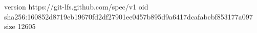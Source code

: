 version https://git-lfs.github.com/spec/v1
oid sha256:160852d8719eb19670fd2df27901ee0457b895d9a6417dcafabcbf853177a097
size 12605
